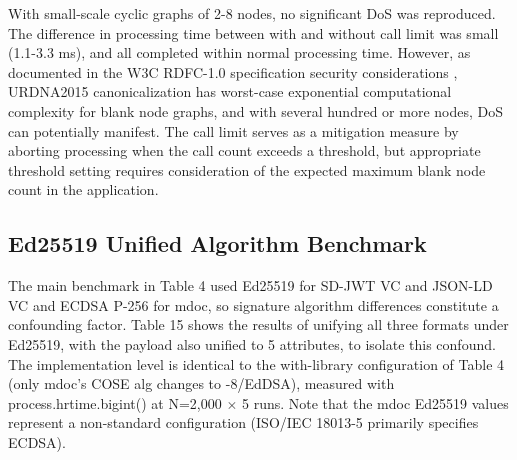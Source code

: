 \documentclass[conference]{IEEEtran}
\begin{document}
\begin{table}[!t]
\centering
\caption{Table 14. Comparison With/Without URDNA2015 Call Limit}\label{tab:14}
\footnotesize
{}
\end{table}

With small-scale cyclic graphs of 2-8 nodes, no significant DoS was reproduced. The difference in processing time between with and without call limit was small (1.1-3.3 ms), and all completed within normal processing time. However, as documented in the W3C RDFC-1.0 specification security considerations \cite{ref9}, URDNA2015 canonicalization has worst-case exponential computational complexity for blank node graphs, and with several hundred or more nodes, DoS can potentially manifest. The call limit serves as a mitigation measure by aborting processing when the call count exceeds a threshold, but appropriate threshold setting requires consideration of the expected maximum blank node count in the application.

\subsection{Ed25519 Unified Algorithm Benchmark}

The main benchmark in Table 4 used Ed25519 for SD-JWT VC and JSON-LD VC and ECDSA P-256 for mdoc, so signature algorithm differences constitute a confounding factor. Table 15 shows the results of unifying all three formats under Ed25519, with the payload also unified to 5 attributes, to isolate this confound. The implementation level is identical to the with-library configuration of Table 4 (only mdoc's COSE alg changes to -8/EdDSA), measured with process.hrtime.bigint() at N=2,000 $\times$ 5 runs. Note that the mdoc Ed25519 values represent a non-standard configuration (ISO/IEC 18013-5 primarily specifies ECDSA).
\end{document}
